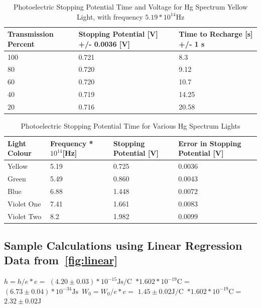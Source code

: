 \documentclass[]{article}
\newcommand{\eVal}{$1.602 * 10^{-19} \si{\coulomb}$}
\newcommand{\yellowFreq}{$5.19 * 10^{14}$}
\newcommand{\he}{$(4.20 \pm 0.03) * 10^{-15} \si{\joule\second\per\coulomb}$}
\newcommand{\hMeasured}{$(6.73 \pm 0.04) * 10^{-34} \si{\joule\second}$}
\newcommand{\we}{$1.45 \pm 0.02 \si{\joule\per\coulomb}$}
\newcommand{\wMeasured}{$2.32 \pm 0.02 \si{\joule}$}
\begin{document}
\begin{table}[H]
    \caption{Photoelectric Stopping Potential Time and Voltage for Hg Spectrum Yellow Light,
    with frequency \yellowFreq$\si{\hertz}$}\label{tab:yellow}
    \begin{tabular}{@{}lll@{}}
        \toprule
        Transmission Percent & Stopping Potential {[}V{]} +/- 0.0036 {[}V{]} & Time to Recharge {[}s{]} +/- 1  s \\ \midrule
        100                 & 0.721                                         & 8.3                               \\
        80                  & 0.720                                         & 9.12                              \\
        60                  & 0.720                                         & 10.7                              \\
        40                  & 0.719                                         & 14.25                             \\
        20                  & 0.716                                         & 20.58                             \\ \bottomrule
    \end{tabular}
\end{table}

\begin{table}[H]
    \caption{Photoelectric Stopping Potential Time for Various Hg Spectrum Lights}\label{tab:frequency}
    \begin{tabular}{@{}llll@{}}
        \toprule
        Light Colour & Frequency * $10^{14}${[}Hz{]} & Stopping Potential {[}V{]} & Error in Stopping Potential {[}V{]} \\ \midrule
        Yellow       & 5.19                          & 0.725                      & 0.0036                              \\
        Green        & 5.49                          & 0.860                      & 0.0043                              \\
        Blue         & 6.88                          & 1.448                      & 0.0072                              \\
        Violet One   & 7.41                          & 1.661                      & 0.0083                              \\
        Violet Two   & 8.2                           & 1.982                      & 0.0099                              \\ \bottomrule
    \end{tabular}
\end{table}

\subsection{Sample Calculations using Linear Regression Data
from~\ref{fig:linear}}
$h = h/e * e =$ \he\ $*$\eVal$ =$ \hMeasured\
$W_0 = W_0/e * e =$ \we\ $*$\eVal$ =$ \wMeasured\


\end{document}
